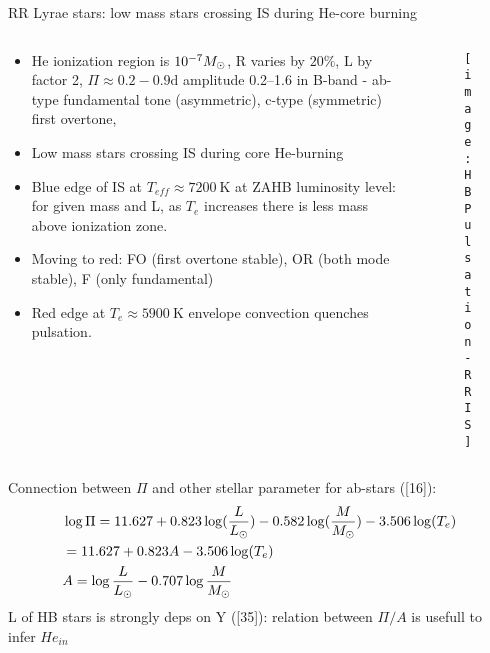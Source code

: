 \begin{frame}{RR Lyrae stars: low mass stars crossing IS during He-core burning}
\begin{columns}[T]
	\begin{column}{0.55\textwidth}
		\begin{itemize}
			\item He ionization region is $\num{e-7}M_{\odot}$, R varies by $20\%$, L by factor 2, $\Pi\approx0.2-0.9\si{\day}$ amplitude \SIrange{0.2}{1.6}{\mag} in B-band - ab-type fundamental tone (asymmetric), c-type (symmetric) first overtone,
            \item Low mass stars crossing IS during core He-burning
            \item Blue edge of IS at $T_{eff}\approx\SI{7200}{\kelvin}$ at ZAHB luminosity level: for given mass and L, as $T_e$ increases there is less mass above ionization zone.
            \item Moving to red: FO (first overtone stable), OR (both mode stable), F (only fundamental)
            \item Red edge at $T_e\approx\SI{5900}{\kelvin}$ envelope convection quenches pulsation.
        \end{itemize}
	\end{column}
	\begin{column}{0.45\textwidth}
	\begin{figure}[!ht] 
	\texttt{[image: HBPulsation-RRIS]}\label{fig:HBPulsation-RRIS}
	\end{figure}
\end{column}\end{columns}
Connection between $\Pi$ and other stellar parameter for ab-stars ([16]):
\begin{align*}
&\log{\Pi}=11.627+0.823\log(\frac{L}{L_{\odot}})-0.582\log(\frac{M}{M_{\odot}})-3.506\log(T_e)\\
&=11.627+0.823A-3.506\log(T_e)\\
&A=\log{\frac{L}{L_{\odot}{}}}-0.707\log{\frac{M}{M_{\odot}{}}}
\end{align*}
L of HB stars is strongly deps on Y ([35]): relation between $\Pi/A$ is usefull to infer $He_{in}$
\end{frame}

